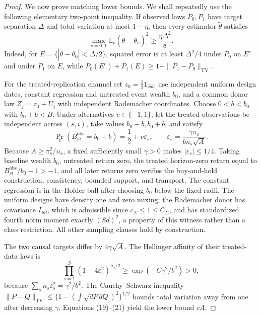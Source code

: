 \documentclass{article}
\begin{document}
\begin{proof}
We now prove matching lower bounds.  We shall repeatedly use the following
elementary two-point inequality.  If observed laws \(P_0,P_1\) have target
separation \(\Delta\) and total variation at most \(1-\eta\), then every
estimator \(\widetilde\theta\) satisfies
\[
 \max_{v=0,1}\mathbb E_v(\widetilde\theta-\theta_v)^2
 \ge\frac{\eta\Delta^2}{8}.                                  \tag{19}
\]
Indeed, for
\(E=\{|\widetilde\theta-\theta_0|<\Delta/2\}\), squared error is at least
\(\Delta^2/4\) under \(P_0\) on \(E^c\) and under \(P_1\) on \(E\), while
\(P_0(E^c)+P_1(E)\ge1-\|P_1-P_0\|_{\mathrm{TV}}\).

For the treated-replication channel set
\(z_0=\tfrac12\mathbf1_{Sd}\), use independent uniform design dates,
constant regression and untreated event wealth \(b_0\), and a common donor
law \(Z_j=z_0+U_j\) with independent Rademacher coordinates.  Choose
\(0<b<b_0\) with \(b_0+b<B\).  Under alternatives \(v\in\{-1,1\}\), let
the treated observations be independent across \((s,i)\), take values
\(b_0-b,b_0+b\), and satisfy
\[
 \Pr_v(B_{si}^{\mathrm{obs}}=b_0+b)=\frac12+v\varepsilon_s,
 \qquad
 \varepsilon_s=\frac{\gamma\pi_s}{bn_s\sqrt A}.              \tag{20}
\]
Because \(A\ge\pi_s^2/n_s\), a fixed sufficiently small \(\gamma>0\)
makes \(|\varepsilon_s|\le1/4\).  Taking baseline wealth \(b_0\), untreated
return zero, the treated horizon-zero return equal to
\(B_{si}^{\mathrm{obs}}/b_0-1>-1\), and all later returns zero verifies the
buy-and-hold construction, consistency, bounded support, and transport.
The constant regression is in the Holder ball after choosing \(b_0\) below
the fixed radii.  The uniform designs have density one and zero mixing; the
Rademacher donor has covariance \(I_{Sd}\), which is admissible since
\(c_\Sigma\le1\le C_\Sigma\), and has standardized fourth norm moment
exactly \((Sd)^2\), a property of this witness rather than a class
restriction.  All other sampling clauses hold by construction.

The two causal targets differ by \(4\gamma\sqrt A\).  The Hellinger affinity
of their treated-data laws is
\[
 \prod_{s=1}^{S}(1-4\varepsilon_s^2)^{n_s/2}
 \ge\exp(-C\gamma^2/b^2)>0,                                   \tag{21}
\]
because \(\sum_sn_s\varepsilon_s^2=\gamma^2/b^2\).  The
Cauchy--Schwarz inequality
\(\|P-Q\|_{\mathrm{TV}}
 \le\{1-(\int\sqrt{dP\,dQ})^2\}^{1/2}\) bounds total variation away from
one after decreasing \(\gamma\).  Equations (19)--(21) yield the lower bound
\(cA\).


\end{proof}
\end{document}
